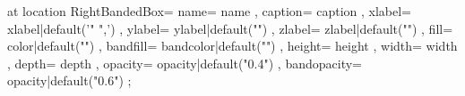 \pic[shift={ {{- offset -}} }] at {{ location }} {
    RightBandedBox={
        name={{ name }},
        caption={{ caption }},
        xlabel={{ xlabel|default('{{" ",}}') }},
        ylabel={{ ylabel|default("") }},
        zlabel={{ zlabel|default("") }},
        fill={{ color|default("\ConvColor") }},
        bandfill={{ bandcolor|default("\ActColor") }},
        height={{ height }},
        width={{ width }},
        depth={{ depth }},
        opacity={{ opacity|default("0.4") }},
        bandopacity={{ opacity|default("0.6") }}
    }
};
